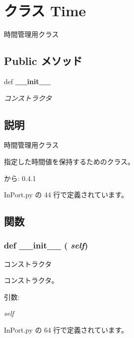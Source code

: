 \section{クラス Time}
\label{classsource__py_1_1_in_port_1_1_time}
時間管理用クラス  


\subsection*{Public メソッド}
\begin{CompactItemize}
\item 
def {\bf \_\-\_\-init\_\-\_\-}
\begin{CompactList}\small\item\em コンストラクタ \item\end{CompactList}\end{CompactItemize}


\subsection{説明}
時間管理用クラス 

指定した時間値を保持するためのクラス。

\begin{Desc}
\item[から:]0.4.1 \end{Desc}


 InPort.py の 44 行で定義されています。

\subsection{関数}
\subsubsection{\setlength{\rightskip}{0pt plus 5cm}def \_\-\_\-init\_\-\_\- ( {\em self})}\label{classsource__py_1_1_in_port_1_1_time_c775ee34451fdfa742b318538164070e}


コンストラクタ 

コンストラクタ。

\begin{Desc}
\item[引数:]
\begin{description}
\item[{\em self}]\end{description}
\end{Desc}


 InPort.py の 64 行で定義されています。